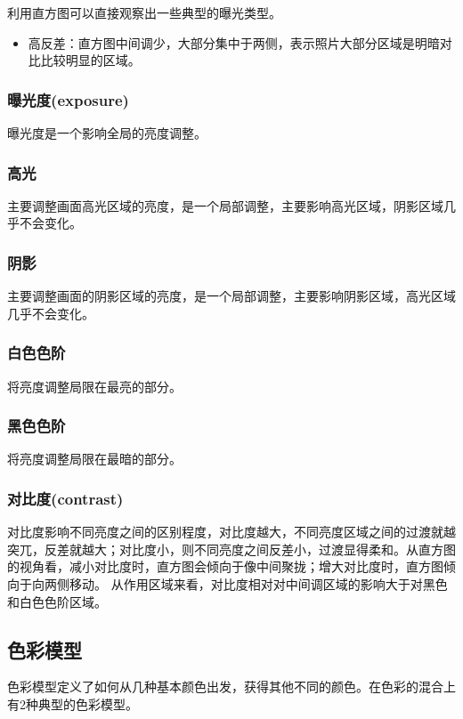 \documentclass{ctexart}
\begin{document}
利用直方图可以直接观察出一些典型的曝光类型。
\begin{itemize}
    \item 高反差：直方图中间调少，大部分集中于两侧，表示照片大部分区域是明暗对比比较明显的区域。
\end{itemize}
\subsubsection{曝光度(exposure)}
曝光度是一个影响全局的亮度调整。

\subsubsection{高光}
主要调整画面高光区域的亮度，是一个局部调整，主要影响高光区域，阴影区域几乎不会变化。

\subsubsection{阴影}
主要调整画面的阴影区域的亮度，是一个局部调整，主要影响阴影区域，高光区域几乎不会变化。

\subsubsection{白色色阶}
将亮度调整局限在最亮的部分。

\subsubsection{黑色色阶}
将亮度调整局限在最暗的部分。

\subsubsection{对比度(contrast)}
对比度影响不同亮度之间的区别程度，对比度越大，不同亮度区域之间的过渡就越突兀，反差就越大；对比度小，则不同亮度之间反差小，过渡显得柔和。从直方图的视角看，减小对比度时，直方图会倾向于像中间聚拢；增大对比度时，直方图倾向于向两侧移动。
从作用区域来看，对比度相对对中间调区域的影响大于对黑色和白色色阶区域。


\subsection{色彩模型}
色彩模型定义了如何从几种基本颜色出发，获得其他不同的颜色。在色彩的混合上有2种典型的色彩模型。
\end{document}
